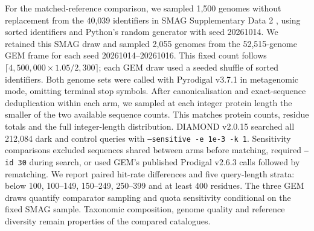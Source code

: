 \documentclass[11pt]{article}
\begin{document}
For the matched-reference comparison, we sampled 1{,}500 genomes without replacement from the
40{,}039 identifiers in SMAG Supplementary Data 2 \citep{ma2023smag}, using sorted identifiers
and Python's random generator with seed 20261014. We retained this SMAG draw and sampled
2{,}055 genomes from the 52{,}515-genome GEM frame for each seed 20261014--20261016.
This fixed count follows $\lceil4{,}500{,}000\times1.05/2{,}300\rceil$; each GEM draw used a
seeded shuffle of sorted identifiers. Both genome sets were called with Pyrodigal v3.7.1
\citep{larralde2022pyrodigal} in metagenomic mode, omitting terminal stop symbols. After
canonicalisation and exact-sequence deduplication within each arm, we sampled at each integer
protein length the smaller of the two available sequence counts. This matches protein counts,
residue totals and the full integer-length distribution. DIAMOND v2.0.15 searched all
212{,}084 dark and control queries with \texttt{--sensitive -e 1e-3 -k 1}.
Sensitivity comparisons excluded sequences shared between arms before matching, required
\texttt{--id 30} during search, or used GEM's published Prodigal v2.6.3 calls followed by
rematching. We report paired hit-rate differences and five query-length strata: below 100,
100--149, 150--249, 250--399 and at least 400 residues. The three GEM draws quantify comparator
sampling and quota sensitivity conditional on the fixed SMAG sample. Taxonomic composition,
genome quality and reference diversity remain properties of the compared catalogues.
\end{document}
